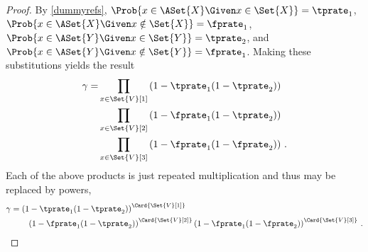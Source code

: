 \begin{proof}
By \cref{dummyrefs}, $\Prob{x \in \ASet{X} \Given x \in \Set{X}} = \tprate_1$, 
$\Prob{x \in \ASet{X} \Given x \notin \Set{X}} = \fprate_1$, $\Prob{x \in 
\ASet{Y} \Given x \in \Set{Y}} = \tprate_2$, and $\Prob{x \in \ASet{Y} \Given x 
\notin \Set{Y}} = \fprate_1$. Making these substitutions yields the result
\begin{equation}
\begin{split}
\gamma =
    &\prod_{x \in \Set{V}[1]}
    \left(1 -
        \tprate_1
        (1 - \tprate_2)
    \right)\\
    &\prod_{x \in \Set{V}[2]}
    \left(1 -
        \fprate_1
        (1 - \tprate_2)
    \right)\\
    &\prod_{x \in \Set{V}[3]}
    \left(1 -
        \fprate_1
        (1 - \fprate_2)
    \right)\,.  
\end{split}    
\end{equation}
Each of the above products is just repeated multiplication and thus may be 
replaced by powers,
\begin{equation}
\begin{split}
\gamma &=
    \left(1 - \tprate_1(1 - \tprate_2)\right)^{\Card{\Set{V}[1]}}\\
    &\qquad \left(1 - \fprate_1(1 - \tprate_2)\right)^{\Card{\Set{V}[2]}}
    \left(1 - \fprate_1(1 - \fprate_2)\right)^{\Card{\Set{V}[3]}}\,.  
\end{split}
\end{equation}
\end{proof}